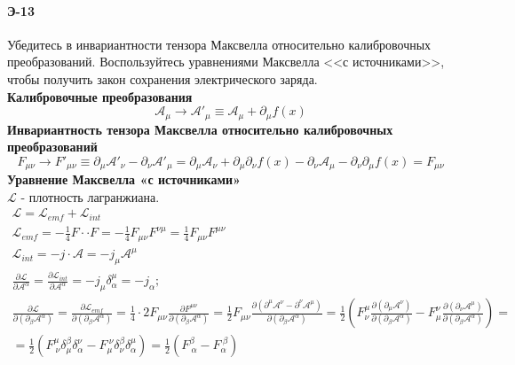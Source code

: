 \documentclass[__main__.tex]{subfiles}
\begin{document}
\paragraph{Э-13}Убедитесь в инвариантности тензора Максвелла относительно калибровочных преобразований. Воспользуйтесь уравнениями Максвелла <<с источниками>>, чтобы получить закон сохранения электрического заряда.\\
\textbf{Калибровочные преобразования}\\
$$\mathcal A_\mu \longrightarrow \mathcal A'_\mu \equiv \mathcal A_\mu +\partial_\mu f(x)$$
\textbf{Инвариантность тензора Максвелла относительно калибровочных преобразований}\\
$$F_{\mu\nu} \longrightarrow F'_{\mu\nu} \equiv \partial_\mu \mathcal A'_\nu - \partial_\nu \mathcal A'_\mu = \partial_\mu \mathcal A_\nu + \partial_\mu \partial_\nu f(x) - \partial_\nu \mathcal A_\mu - \partial_\nu\partial_\mu f(x) = F_{\mu\nu}$$
\textbf{Уравнение Максвелла «с источниками»}\\
$\mathcal L$ - плотность лагранжиана. 
\begin{gather*}
\mathcal L = \mathcal L_{emf} + \mathcal L_{int}\\
\mathcal L_{emf} = -\frac{1}{4} F \cdot\cdot F = -\frac{1}{4}F_{\mu \nu}F^{\nu\mu} = \frac{1}{4}F_{\mu\nu}F^{\mu\nu}\\
\mathcal L_{int} = -j \cdot \mathcal A = -j_\mu \mathcal A^\mu\\
\frac{\partial\mathcal L}{\partial \mathcal A^\alpha} = \frac{\partial\mathcal L_{int}}{\partial \mathcal A^\alpha} = -j_\mu \delta_\alpha^\mu = -j_\alpha;\\
\frac{\partial \mathcal L}{\partial(\partial_\beta \mathcal A^\alpha)} = \frac{\partial \mathcal L_{emf}}{\partial(\partial_\beta\mathcal A^\alpha)} = \frac{1}{4} \cdot 2F_{\mu\nu}\frac{\partial F^{\mu \nu}}{\partial(\partial_\beta \mathcal A^\alpha)} = \frac{1}{2}F_{\mu\nu}\frac{\partial(\partial^\mu\mathcal A^\nu - \partial^\nu \mathcal A^\mu)}{\partial(\partial_\beta \mathcal A^\alpha)} = \frac{1}{2}\left(F^\mu_\nu\frac{\partial(\partial_\mu\mathcal A^\nu)}{\partial(\partial_\beta \mathcal A^\alpha)} - F^\nu_\mu\frac{\partial(\partial_\nu\mathcal A^\mu)}{\partial(\partial_\beta \mathcal A^\alpha)}\right) =\\ =  \frac{1}{2} \left( F^\mu_{\ \nu} \delta^\beta_\mu \delta^\nu_\alpha - F^{\ \nu}_\mu \delta^\beta_\nu \delta^\mu_\alpha \right) = \frac{1}{2} \left(F^\beta_{\ \alpha} - F^{\ \beta}_\alpha\right)
\end{gather*}
\end{document}
